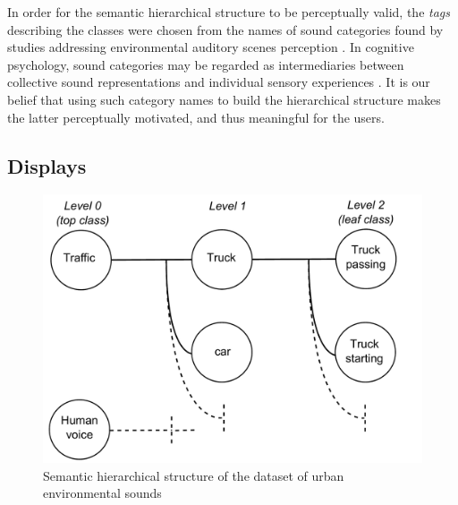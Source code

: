 \documentclass{aes2e}
\begin{document}
In order for the semantic hierarchical structure to be perceptually valid, the \textit{tags} describing the classes  were chosen from the names of sound categories found by studies addressing environmental auditory scenes perception \cite{niessen2010categories, brown2011towards, dubois2006cognitive}. In cognitive psychology, sound categories may be regarded as intermediaries between collective sound representations and individual sensory experiences \cite{dubois2006cognitive}. It is our belief that using such category names to build the hierarchical structure makes the latter perceptually motivated, and thus meaningful for the users.



\subsection{Displays}

\begin{figure}[t]
\begin{center}
\includegraphics[scale=0.24]{gfx/dataset.pdf} 
\end{center}
\caption{\label{figdataset} Semantic hierarchical structure of the dataset of urban environmental sounds}
\end{figure}
\end{document}
